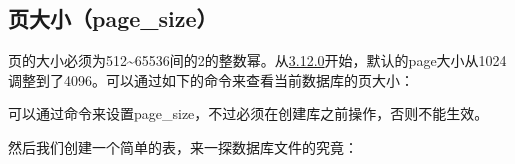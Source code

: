 \documentclass[12pt]{article}
\begin{document}
\subsection{页大小（page\_size）}\label{ux9875ux5927ux5c0fpage_size}

页的大小必须为512\textasciitilde65536间的2的整数幂。从\href{https://www.sqlite.org/releaselog/3_12_0.html}{3.12.0}开始，默认的page大小从1024调整到了4096。可以通过如下的命令来查看当前数据库的页大小：

\begin{Shaded}
\begin{Highlighting}[]
\OperatorTok{\textgreater{}}\KeywordTok{;}
\OperatorTok{\textgreater{}}\KeywordTok{;}
\end{Highlighting}
\end{Shaded}

可以通过命令来设置page\_size，不过必须在创建库之前操作，否则不能生效。

\begin{Shaded}
\begin{Highlighting}[]
 
\OperatorTok{\textgreater{}}\KeywordTok{;}
\OperatorTok{\textgreater{}}\KeywordTok{;}
\OperatorTok{\textgreater{}}\KeywordTok{;}
\end{Highlighting}
\end{Shaded}

然后我们创建一个简单的表，来一探数据库文件的究竟：

\begin{Shaded}
\begin{Highlighting}[]
 
         \NormalTok{,}
\NormalTok{,}
\NormalTok{);}
\end{Highlighting}
\end{Shaded}
\end{document}

